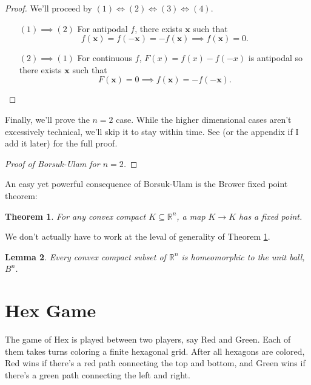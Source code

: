 \documentclass[12pt]{amsart}
\newtheorem{thm}{Theorem}[section]
\newtheorem{lem}[thm]{Lemma}
\theoremstyle{definition}
\begin{document}
    \begin{proof} We'll proceed by $(1) \iff (2) \iff (3) \iff (4)$.

        \begin{enumerate}
            \item[$(1) \implies (2)$] For antipodal $f$, there exists $\mathbf x$ such that $$f(\mathbf x) = f(-\mathbf x) = -f(\mathbf x) \implies f(\mathbf x) = 0.$$
            \item[$(2) \implies (1)$] For continuous $f$, $F(x) = f(x) - f(-x)$ is antipodal so there exists $\mathbf x$ such that $$F(\mathbf x) = 0 \implies f(\mathbf x) = -f(-\mathbf x).$$
        \end{enumerate}
    \end{proof}

    Finally, we'll prove the $n=2$ case. While the higher dimensional cases aren't excessively technical, we'll skip it to stay within time. See \cite[ch 2]{topcombi} (or the appendix if I add it later) for the full proof.

    \begin{proof}[Proof of Borsuk-Ulam for $n=2$]

    \end{proof}

    An easy yet powerful consequence of Borsuk-Ulam is the Brower fixed point theorem:
    \begin{thm}
        \label{brower}
        For any convex compact $K \subseteq \mathbb R^n$, a map $K \to K$ has a fixed point.
    \end{thm}

    We don't actually have to work at the leval of generality of Theorem \ref{brower}.

    \begin{lem}
        Every convex compact subset of $\mathbb R^n$ is homeomorphic to the unit ball, $B^n$.
    \end{lem}
    
    \newpage

    \section{Hex Game}

    The game of Hex is played between two players, say Red and Green. Each of them takes turns coloring a finite hexagonal grid. After all hexagons are colored, Red wins if there's a red path connecting the top and bottom, and Green wins if there's a green path connecting the left and right. 
\end{document}
